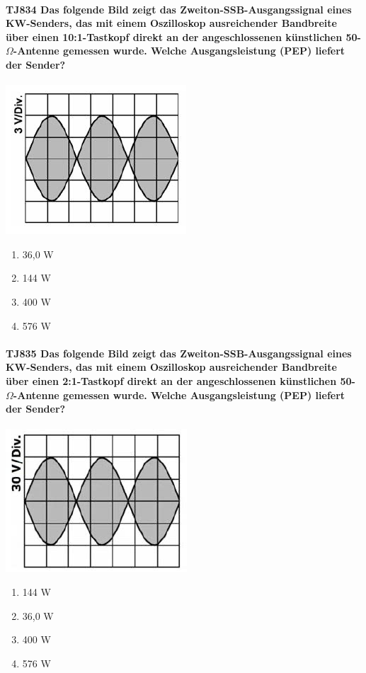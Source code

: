 \documentclass[8pt]{article}
\begin{document}
\paragraph*{TJ834 Das folgende Bild zeigt das Zweiton-SSB-Ausgangssignal eines KW-Senders, das mit einem Oszilloskop ausreichender Bandbreite über einen 10:1-Tastkopf direkt an der angeschlossenen künstlichen 50-$\Omega$-Antenne gemessen wurde. Welche Ausgangsleistung (PEP) liefert der Sender?}
\begin{center}
	\begin{minipage}{\linewidth}
		\centering
		\includegraphics[scale=1.0]{pics/tj834_a.jpg}
	\end{minipage}
\end{center}
\begin{enumerate}[nolistsep,label=\Alph*]
\item 36,0 W
\item 144 W
\item 400 W
\item 576 W
\end{enumerate}

\paragraph*{TJ835 Das folgende Bild zeigt das Zweiton-SSB-Ausgangssignal eines KW-Senders, das mit einem Oszilloskop ausreichender Bandbreite über einen 2:1-Tastkopf direkt an der angeschlossenen künstlichen 50-$\Omega$-Antenne gemessen wurde. Welche Ausgangsleistung (PEP) liefert der Sender?}
\begin{center}
	\begin{minipage}{\linewidth}
		\centering
		\includegraphics[scale=1.0]{pics/tj835_a.jpg}
	\end{minipage}
\end{center}
\begin{enumerate}[nolistsep,label=\Alph*]
\item 144 W
\item 36,0 W
\item 400 W
\item 576 W
\end{enumerate}
\end{document}
